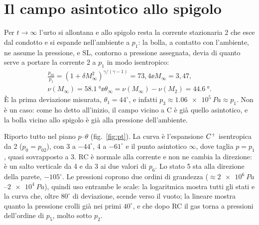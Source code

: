 \section*{Il campo asintotico allo spigolo}
Per $t\to\infty$ l'urto si allontana e allo spigolo resta la corrente stazionaria 2 che esce dal condotto e si espande
nell'ambiente a $p_1$: la bolla, a contatto con l'ambiente, ne assume la pressione, e SL, contorno a pressione
assegnata, devia di quanto serve a portare la corrente 2 a $p_1$ in modo isentropico:
\begin{gather*}
  \frac{p_{02}}{p_1}=(1+\delta M_\infty^2)^{\gamma/(\gamma-1)}=73{,}4 \ee M_\infty=3{,}47,\\
  \nu(M_\infty)=\SI{58.1}{\degree} \ee \theta_\infty=\nu(M_\infty)-\nu(M_2)=\SI{44.6}{\degree}.
\end{gather*}
È la prima deviazione misurata, $\theta_1=44^\circ$, e infatti $p_3\approx\SI{1.06e5}{Pa}\approx p_1$. Non è un caso:
come ho detto all'inizio, il campo vicino a C è già quello asintotico, e la bolla vicino allo spigolo è già alla
pressione dell'ambiente.

Riporto tutto nel piano $p$--$\theta$ (fig.~\ref{fig:pt}). La curva è l'espansione $C^{+}$ isentropica da 2
($p_0=p_{02}$), con 3 a $-44^\circ$, 4 a $-61^\circ$ e il punto asintotico $\infty$, dove taglia $p=p_1$, quasi
sovrapposto a 3. RC è normale alla corrente e non ne cambia la direzione: è un salto verticale da 4 e da 3 ai due
valori di $p_6$. Lo stato 5 sta alla direzione della parete, $-105^\circ$. Le pressioni coprono due ordini di
grandezza ($\approx\SI{2e6}{Pa}$--$\SI{2e4}{Pa}$), quindi uso entrambe le scale: la logaritmica mostra tutti gli stati
e la curva che, oltre $80^\circ$ di deviazione, scende verso il vuoto; la lineare mostra quanto la pressione crolli
già nei primi $40^\circ$, e che dopo RC il gas torna a pressioni dell'ordine di $p_5$, molto sotto $p_2$.



